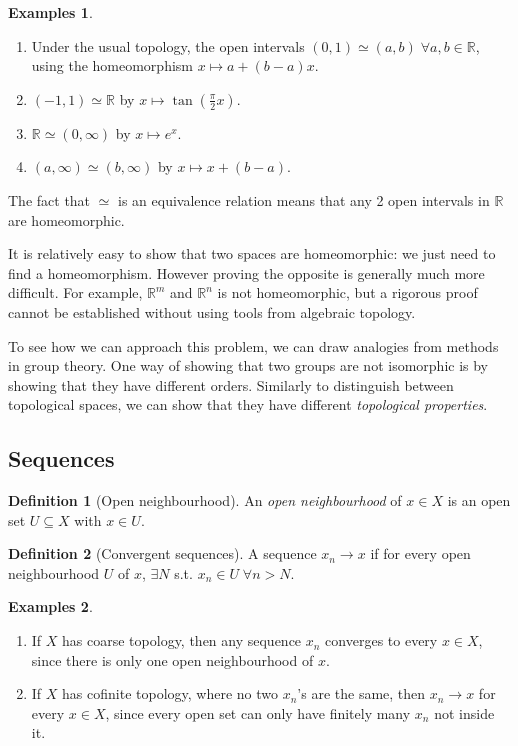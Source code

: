 \documentclass[a4paper,11pt]{article}
\theoremstyle{definition}
\newtheorem*{defn}{Definition}
\newtheorem*{exs}{Examples}
\numberwithin{equation}{section}
\begin{document}
\begin{exs}
\leavevmode
\begin{enumerate}
    \item Under the usual topology, the open intervals $(0,1)\simeq(a,b)\;\forall a,b\in \mathbb{R}$, using the homeomorphism $x\mapsto a+(b-a)x$.
    \item $(-1,1)\simeq\mathbb{R}$ by $x\mapsto \tan(\frac{\pi}{2}x)$.
    \item $\mathbb{R}\simeq(0,\infty)$ by $x\mapsto e^x$.
    \item $(a,\infty)\simeq (b,\infty)$ by $x\mapsto x+(b-a)$.
\end{enumerate}
The fact that $\simeq$ is an equivalence relation means that any 2 open intervals in $\mathbb{R}$ are homeomorphic. 
\end{exs}

It is relatively easy to show that two spaces are homeomorphic: we just need to find a homeomorphism. However proving the opposite is generally much more difficult. For example, $\mathbb{R}^m$ and $\mathbb{R}^n$ is not homeomorphic, but a rigorous proof cannot be established without using tools from algebraic topology.

To see how we can approach this problem, we can draw analogies from methods in group theory. One way of showing that two groups are not isomorphic is by showing that they have different orders. Similarly to distinguish between topological spaces, we can show that they have different \emph{topological properties}.

\subsection{Sequences}
\begin{defn}[Open neighbourhood]
An \emph{open neighbourhood} of $x\in X$ is an open set $U\subseteq X$ with $x\in U$.
\end{defn}

\begin{defn}[Convergent sequences]
    A sequence $x_n\rightarrow x$ if for every open neighbourhood $U$ of $x$, $\exists N$ s.t. $x_n\in U\;\forall n>N$.
\end{defn}

\begin{exs}
\leavevmode
\begin{enumerate}
    \item If $X$ has coarse topology, then any sequence $x_n$ converges to every $x\in X$, since there is only one open neighbourhood of $x$.
    \item If $X$ has cofinite topology, where no two $x_n$'s are the same, then $x_n\rightarrow x$ for every $x\in X$, since every open set can only have finitely many $x_n$ not inside it.
\end{enumerate}
\end{exs}
\end{document}

